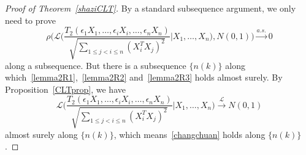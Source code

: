 \documentclass[review]{elsarticle}
\theoremstyle{plain}
\theoremstyle{definition}
\theoremstyle{remark}
\begin{document}
\begin{proof}[Proof of Theorem~\ref{shaziCLT}]
By a standard subsequence argument, we only need to prove 
    \begin{equation}\label{changchuan}
        \rho\Big(\mathcal{L}\Big(\frac{T_2(\epsilon_1 X_1,\ldots, \epsilon_i X_i,\ldots,\epsilon_n X_n)}{\sqrt{\sum_{1\leq j<i\leq n}{(X_i^T X_j)}^2}}\Big|X_1,\ldots,X_n\Big),N(0,1)\Big)\xrightarrow{a.s.} 0
    \end{equation}
     along a subsequence.
    But there is a subsequence $\{n(k)\}$ along which~\eqref{lemma2R1},~\eqref{lemma2R2} and~\eqref{lemma2R3} holds almost surely.
    By Proposition~\ref{CLTprop}, we have
    \begin{equation*}
        \mathcal{L}\Big(\frac{T_2(\epsilon_1 X_1,\ldots, \epsilon_i X_i,\ldots,\epsilon_n X_n)}{\sqrt{\sum_{1\leq j<i\leq n}{(X_i^T X_j)}^2}}\Big|X_1,\ldots,X_n\Big)\xrightarrow{\mathcal{L}}N(0,1)
    \end{equation*}
    almost surely along $\{n(k)\}$, which means~\eqref{changchuan} holds along $\{n(k)\}$.

\end{proof}
\end{document}
